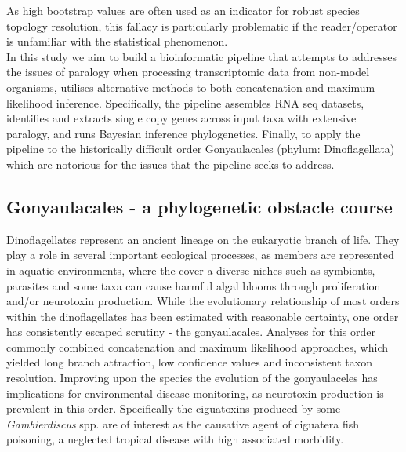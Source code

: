 \documentclass[12pt]{article}
\begin{document}
As high bootstrap values are often used as an indicator for robust species topology resolution, this fallacy is particularly problematic if the reader/operator is unfamiliar with the statistical phenomenon.\\
In this study we aim to build a bioinformatic pipeline that attempts to addresses the issues of paralogy when processing transcriptomic data from non-model organisms, utilises alternative methods to both concatenation and maximum likelihood inference. 
Specifically, the pipeline assembles RNA seq datasets, identifies and extracts single copy genes across input taxa with extensive paralogy, and runs Bayesian inference phylogenetics. 
Finally, to apply the pipeline to the historically difficult order Gonyaulacales (phylum: Dinoflagellata) which are notorious for the issues that the pipeline seeks to address.\\
\subsection*{Gonyaulacales - a phylogenetic obstacle course}
Dinoflagellates represent an ancient lineage on the eukaryotic branch of life. 
They play a role in several important ecological processes, as members are represented in aquatic environments, where the cover a diverse niches such as symbionts, parasites and some taxa can cause harmful algal blooms through proliferation and/or neurotoxin production.
While the evolutionary relationship of most orders within the dinoflagellates has been estimated with reasonable certainty, one order has consistently escaped scrutiny - the gonyaulacales. 
Analyses for this order commonly combined concatenation and maximum likelihood approaches, which yielded long branch attraction, low confidence values and inconsistent taxon resolution. 
Improving upon the species the evolution of the gonyaulaceles has implications for environmental disease monitoring, as neurotoxin production is prevalent in this order. 
Specifically the ciguatoxins produced by some \emph{Gambierdiscus} spp. are of interest as the causative agent of ciguatera fish poisoning, a neglected tropical disease with high associated morbidity.%
\end{document}
